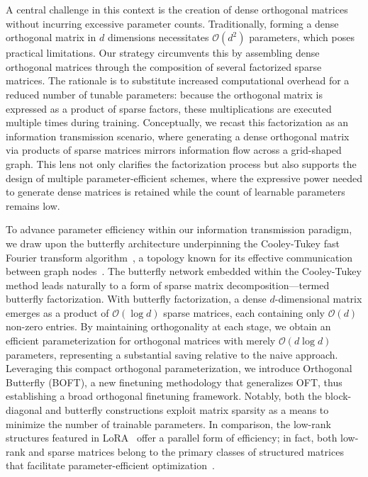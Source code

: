 A central challenge in this context is the creation of dense orthogonal matrices without incurring excessive parameter counts. Traditionally, forming a dense orthogonal matrix in $d$ dimensions necessitates $\mathcal{O}(d^2)$ parameters, which poses practical limitations. Our strategy circumvents this by assembling dense orthogonal matrices through the composition of several factorized sparse matrices. The rationale is to substitute increased computational overhead for a reduced number of tunable parameters: because the orthogonal matrix is expressed as a product of sparse factors, these multiplications are executed multiple times during training. Conceptually, we recast this factorization as an information transmission scenario, where generating a dense orthogonal matrix via products of sparse matrices mirrors information flow across a grid-shaped graph. This lens not only clarifies the factorization process but also supports the design of multiple parameter-efficient schemes, where the expressive power needed to generate dense matrices is retained while the count of learnable parameters remains low.

To advance parameter efficiency within our information transmission paradigm, we draw upon the butterfly architecture underpinning the Cooley-Tukey fast Fourier transform algorithm~\cite{cooley1965algorithm}, a topology known for its effective communication between graph nodes~\cite{klasing1994broadcasting}. The butterfly network embedded within the Cooley-Tukey method leads naturally to a form of sparse matrix decomposition—termed butterfly factorization. With butterfly factorization, a dense $d$-dimensional matrix emerges as a product of $\mathcal{O}(\log d)$ sparse matrices, each containing only $\mathcal{O}(d)$ non-zero entries. By maintaining orthogonality at each stage, we obtain an efficient parameterization for orthogonal matrices with merely $\mathcal{O}(d\log d)$ parameters, representing a substantial saving relative to the naive approach. Leveraging this compact orthogonal parameterization, we introduce Orthogonal Butterfly (BOFT), a new finetuning methodology that generalizes OFT, thus establishing a broad orthogonal finetuning framework. Notably, both the block-diagonal and butterfly constructions exploit matrix sparsity as a means to minimize the number of trainable parameters. In comparison, the low-rank structures featured in LoRA~\cite{hulora2022} offer a parallel form of efficiency; in fact, both low-rank and sparse matrices belong to the primary classes of structured matrices that facilitate parameter-efficient optimization~\cite{candes2011robust}.


